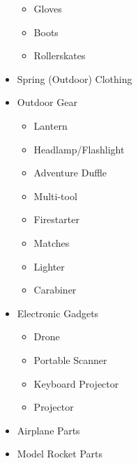 \documentclass[12pt]{article}
\begin{document}
\begin{multicols}{2}
\begin{itemize}[noitemsep]
\begin{itemize}[noitemsep,nosep]
\item Gloves
\item Boots
\item Rollerskates
\end{itemize}
\item Spring (Outdoor) Clothing
\item Outdoor Gear
\begin{itemize}[noitemsep,nosep]
\item Lantern
\item Headlamp/Flashlight
\item Adventure Duffle
\item Multi-tool
\item Firestarter
\item Matches
\item Lighter
\item Carabiner
\end{itemize}
\item Electronic Gadgets
\begin{itemize}[noitemsep,nosep]
\item Drone
\item Portable Scanner
\item Keyboard Projector
\item Projector
\end{itemize}
\item Airplane Parts
\item Model Rocket Parts
\end{itemize}
\end{multicols}
\newpage


\end{document}
